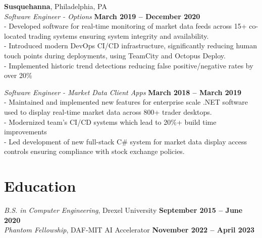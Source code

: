 \documentclass[margin,line]{resume}
\begin{document}
\begin{resume}
    \textbf{Susquehanna}, Philadelphia, PA \vspace{2mm}\\\vspace{1mm}%
    \textsl{Software Engineer - Options} \hfill \textbf{March 2019 -- December 2020}\\
    - Developed software for real-time monitoring of market data feeds across 15+ co-located trading systems ensuring system integrity and availability.\vspace{1mm}\\%
    - Introduced modern DevOps CI/CD infrastructure, significantly reducing human touch points during deployments, using TeamCity and Octopus Deploy.\vspace{1mm}\\%
    - Implemented historic trend detections reducing false positive/negative rates by over 20\%

    \textsl{Software Engineer - Market Data Client Apps} \hfill \textbf{March 2018 -- March 2019}\\
    - Maintained and implemented new features for enterprise scale .NET software used to display real-time market data across 800+ trader desktops.\vspace{1mm}\\%
    - Modernized team's CI/CD systems which lead to 20\%+ build time improvements\vspace{1mm}\\%
    - Led development of new full-stack C\# system for market data display access controls ensuring compliance with stock exchange policies.
 
    \section{\mysidestyle Education}

    \textsl{B.S. in Computer Engineering}, Drexel University \hfill \textbf{ September 2015 -- June 2020}\\\vspace{-1mm}%
    \textsl{Phantom Fellowship}, DAF-MIT AI Accelerator \hfill \textbf{ November 2022 -- April 2023 }\\\vspace{-2mm}%




\end{resume}
\end{document}
